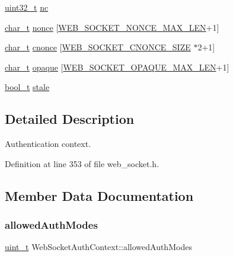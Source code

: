 \begin{DoxyCompactItemize}
\item 
\hyperlink{stdint_8h_a435d1572bf3f880d55459d9805097f62}{uint32\+\_\+t} \hyperlink{structWebSocketAuthContext_a23961b8af61e72b164bde15362baa8a5}{nc}
\item 
\hyperlink{compiler__port_8h_a40bb5262bf908c328fbcfbe5d29d0201}{char\+\_\+t} \hyperlink{structWebSocketAuthContext_a76375cce9f84668fc50430de22dafc10}{nonce} \mbox{[}\hyperlink{web__socket_8h_a48d19c4a819af2a5c5b3fea833a7c7ea}{W\+E\+B\+\_\+\+S\+O\+C\+K\+E\+T\+\_\+\+N\+O\+N\+C\+E\+\_\+\+M\+A\+X\+\_\+\+L\+EN}+1\mbox{]}
\item 
\hyperlink{compiler__port_8h_a40bb5262bf908c328fbcfbe5d29d0201}{char\+\_\+t} \hyperlink{structWebSocketAuthContext_ab0845a2003e5f41154be669607a5e85c}{cnonce} \mbox{[}\hyperlink{web__socket_8h_a9a4f07ca6ff80b9ce6df8a8de49760e8}{W\+E\+B\+\_\+\+S\+O\+C\+K\+E\+T\+\_\+\+C\+N\+O\+N\+C\+E\+\_\+\+S\+I\+ZE} $\ast$2+1\mbox{]}
\item 
\hyperlink{compiler__port_8h_a40bb5262bf908c328fbcfbe5d29d0201}{char\+\_\+t} \hyperlink{structWebSocketAuthContext_aea6c6e4970c40b250d06dc458f142dd5}{opaque} \mbox{[}\hyperlink{web__socket_8h_a1703dd1ad84a33246b072ed9a3042d5f}{W\+E\+B\+\_\+\+S\+O\+C\+K\+E\+T\+\_\+\+O\+P\+A\+Q\+U\+E\+\_\+\+M\+A\+X\+\_\+\+L\+EN}+1\mbox{]}
\item 
\hyperlink{compiler__port_8h_a812d16e5494522586b3784e55d479912}{bool\+\_\+t} \hyperlink{structWebSocketAuthContext_a19357f3f322cd3ffeb07fb8fed174181}{stale}
\end{DoxyCompactItemize}


\subsection{Detailed Description}
Authentication context. 

Definition at line 353 of file web\+\_\+socket.\+h.



\subsection{Member Data Documentation}
\mbox{\label{structWebSocketAuthContext_adb63e01f01d517c51fec717e2d3cf21e}} 
\subsubsection{\texorpdfstring{allowed\+Auth\+Modes}{allowedAuthModes}}
{\footnotesize\ttfamily \hyperlink{compiler__port_8h_a12a1e9b3ce141648783a82445d02b58d}{uint\+\_\+t} Web\+Socket\+Auth\+Context\+::allowed\+Auth\+Modes}



